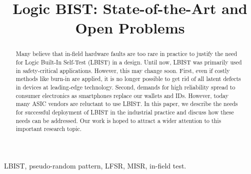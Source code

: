 \documentclass[conference]{IEEEtran}
\begin{document}
\title{Logic BIST: State-of-the-Art and Open Problems}

\author{
\and
{}
\and
{}
\and
{}
}

\maketitle

\begin{abstract}
Many believe that in-field hardware faults are too rare in practice to justify the need for Logic Built-In Self-Test (LBIST) in a design. Until now, LBIST was primarily used in safety-critical applications. However, this may change soon. First, even if costly methods like burn-in are applied, it is no longer possible to get rid of all latent defects in devices at leading-edge technology. Second, demands for high reliability spread to consumer electronics as smartphones replace our wallets and IDs. 
However, today many ASIC vendors are reluctant to use LBIST.
In this paper, we describe the needs for successful deployment of LBIST in the industrial practice and discuss how these needs can be addressed. Our work is hoped to attract a wider attention to this important research topic.  
\end{abstract}

\begin{IEEEkeywords}
LBIST, pseudo-random pattern, LFSR, MISR, in-field test.
\end{IEEEkeywords}
\end{document}

